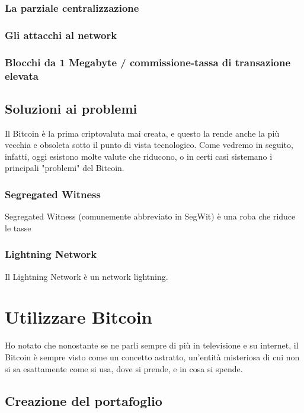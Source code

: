 \documentclass {article}
\begin{document}
\subsubsection {La parziale centralizzazione}


\subsubsection {Gli attacchi al network} %


\subsubsection {Blocchi da 1 Megabyte / commissione-tassa di transazione elevata}


\subsection {Soluzioni ai problemi}


Il Bitcoin è la prima criptovaluta mai creata, e questo la rende anche la più vecchia e obsoleta sotto il punto di vista tecnologico. Come vedremo in seguito, infatti, oggi esistono molte valute che riducono, o in certi casi sistemano i principali "problemi" del Bitcoin.


\subsubsection {Segregated Witness}


Segregated Witness (comunemente abbreviato in SegWit) è una roba che riduce le tasse


\subsubsection {Lightning Network}


Il Lightning Network è un network lightning.


\section {Utilizzare Bitcoin}


Ho notato che nonostante se ne parli sempre di più in televisione e su internet, il Bitcoin è sempre visto come un concetto astratto, un'entità misteriosa di cui non si sa esattamente come si usa, dove si prende, e in cosa si spende.


\subsection {Creazione del portafoglio}
\end{document}
